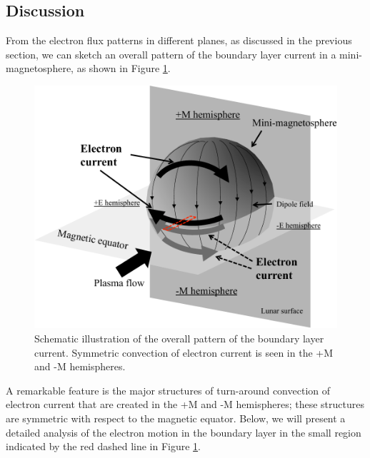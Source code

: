 \documentclass[draft,jgrga]{agutex2015}
\begin{document}
\begin{article}
\section{Discussion}
From the electron flux patterns 
in different planes, as discussed in the previous section, 
we can sketch an overall pattern of the boundary layer current 
in a mini-magnetosphere,
as shown in Figure \ref{fig:sketch}.
\begin{figure}
\centering
\noindent\includegraphics[width=15cm]{./figures/Fig_sketch_bb-crop.pdf}
\caption{
Schematic illustration of the overall pattern of the boundary layer current. 
Symmetric convection of electron current 
is seen in the +M and -M hemispheres. 
}
\label{fig:sketch}
\end{figure}
%
%
A remarkable feature is the major structures 
of turn-around convection of electron current
that are created in the +M and -M hemispheres; these structures are symmetric
with respect to the magnetic equator.
Below, we will present a detailed analysis of the electron motion in the boundary layer in the small region indicated by the red dashed line in Figure \ref{fig:sketch}.
\begin{figure}
\centering

\end{figure}
\end{article}
\end{document}
